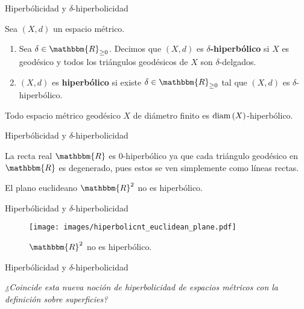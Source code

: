 \documentclass[xcolor=dvipsnames]{beamer}
\theoremstyle{largebreak}
\newcommand{\bbm}[1]{\ensuremath{\mathbbm{#1}}}
\newcommand{\Diam}[1]{\ensuremath{\textup{diam}\left(#1\right)}}
\begin{document}
\begin{frame}{Hiperbólicidad y $\delta$-hiperbolicidad}
    \begin{mydef}
        Sea $(X,d)$ un espacio métrico.
        \begin{enumerate}[label = \textit{(\arabic*)}]
            \item Sea $\delta\in\bbm{R}_{\geq0}$. Decimos que $(X,d)$ es \textbf{$\delta$-hiperbólico} si $X$ es geodésico y todos los triángulos geodésicos de $X$ son $\delta$-delgados.
            \item $(X,d)$ es \textbf{hiperbólico} si existe $\delta\in\bbm{R}_{\geq0}$ tal que $(X,d)$ es $\delta$-hiperbólico.
        \end{enumerate}
    \end{mydef}

    \pause

    \begin{exa}
        Todo espacio métrico geodésico $X$ de diámetro finito es $\Diam{X}$-hiperbólico. 
    \end{exa}
\end{frame}

\begin{frame}{Hiperbólicidad y $\delta$-hiperbolicidad}
    \begin{exa}
        La recta real $\bbm{R}$ es $0$-hiperbólico ya que cada triángulo geodésico en $\bbm{R}$ es degenerado, pues estos se ven simplemente como líneas rectas.
    \end{exa}

    \pause

    \begin{exa}
        El plano euclideano $\bbm{R}^2$ no es hiperbólico.
    \end{exa}
\end{frame}

\begin{frame}{Hiperbólicidad y $\delta$-hiperbolicidad}
    \begin{figure}
        \begin{center}
            \texttt{[image: images/hiperbolicnt\_euclidean\_plane.pdf]}
        \end{center}
        \caption{$\bbm{R}^2$ no es hiperbólico.}
    \end{figure}
\end{frame}

\begin{frame}{Hiperbólicidad y $\delta$-hiperbolicidad}
    \begin{center}
        \Large\textit{¿Coincide esta nueva noción de hiperbolicidad de espacios métricos con la definición sobre superficies?}
    \end{center}
\end{frame}
\end{document}
